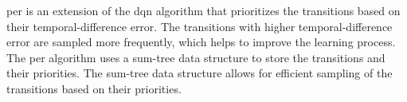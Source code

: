\Gls{per} is an extension of the \gls{dqn} algorithm that prioritizes the
transitions based on their temporal-difference error. The transitions with
higher temporal-difference error are sampled more frequently, which helps to
improve the learning process. The \gls{per} algorithm uses a sum-tree data
structure to store the transitions and their priorities. The sum-tree data
structure allows for efficient sampling of the transitions based on their
priorities.



